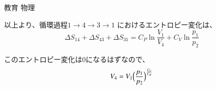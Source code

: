 \documentclass[fleqn]{jbook}
\begin{document}
\begin{answer}{教育 物理}{}
\begin{subanswers}
\begin{subsubanswers}
以上より、循環過程$1 \rightarrow 4 \rightarrow 3\rightarrow 1$
におけるエントロピー変化は、
\[
\Delta S_{14} + \Delta S_{43} + \Delta S_{31}
= C_{P}\ln\frac{V_{1}}{V_{4}} + C_{V}\ln\frac{p_{1}}{p_{2}}
\]

このエントロピー変化は0になるはずなので、
\begin{eqnarray*}
V_4=V_1 \Bigl(\frac{p_1}{p_2}\Bigl)^\frac{C_v}{C_p}
\end{eqnarray*}
\end{subsubanswers}


\end{subanswers}
\end{answer}
\end{document}
